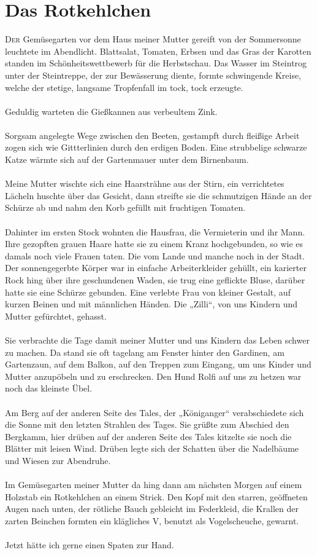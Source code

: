 \chapter{Das Rotkehlchen}
\lettrine{D}{er} Gemüsegarten vor dem Haus meiner Mutter gereift von der Sommersonne leuchtete im Abendlicht. Blattsalat, Tomaten, Erbsen und das Gras der Karotten standen im Schönheitswettbewerb für die Herbstschau. Das Wasser im Steintrog unter der Steintreppe, der zur Bewässerung diente, formte schwingende Kreise, welche der stetige, langsame Tropfenfall im tock, tock erzeugte.\\\\
Geduldig warteten die Gießkannen aus verbeultem Zink.\\\\
Sorgsam angelegte Wege zwischen den Beeten, gestampft durch fleißige Arbeit zogen sich wie Gittterlinien durch den erdigen Boden. Eine strubbelige schwarze Katze wärmte sich auf der Gartenmauer unter dem Birnenbaum. \\\\
Meine Mutter wischte sich eine Haarsträhne aus der Stirn, ein verrichtetes Lächeln huschte über das Gesicht, dann streifte sie die schmutzigen Hände an der Schürze ab und nahm den Korb gefüllt mit fruchtigen Tomaten. \\\\
Dahinter im ersten Stock wohnten die Hausfrau, die Vermieterin und ihr Mann. Ihre gezopften grauen Haare hatte sie zu einem Kranz hochgebunden, so wie es damals noch viele Frauen taten. Die vom Lande und manche noch in der Stadt. Der sonnengegerbte Körper war in einfache Arbeiterkleider gehüllt, ein karierter Rock hing über ihre geschundenen Waden, sie trug eine geflickte Bluse, darüber hatte sie eine Schürze gebunden. Eine verlebte Frau von kleiner Gestalt, auf kurzen Beinen und mit männlichen Händen. Die „Zilli“, von uns Kindern und Mutter gefürchtet, gehasst. \\\\
Sie verbrachte die Tage damit meiner Mutter und uns Kindern das Leben schwer zu machen. Da stand sie oft tagelang am Fenster hinter den Gardinen, am Gartenzaun, auf dem Balkon, auf den Treppen zum Eingang, um uns Kinder und Mutter anzupöbeln und zu erschrecken. Den Hund Rolfi auf uns zu hetzen war noch das kleinste Übel. \\\\
Am Berg auf der anderen Seite des Tales, der „Königanger“ verabschiedete sich die Sonne mit den letzten Strahlen des Tages. Sie grüßte zum Abschied den Bergkamm, hier drüben auf der anderen Seite des Tales kitzelte sie noch die Blätter mit leisen Wind. Drüben legte sich der Schatten über die Nadelbäume und Wiesen zur Abendruhe.\\\\
Im Gemüsegarten meiner Mutter da hing dann am nächsten Morgen auf einem Holzstab ein Rotkehlchen an einem Strick. Den Kopf mit den starren, geöffneten Augen nach unten, der rötliche Bauch gebleicht im Federkleid, die Krallen der zarten Beinchen formten ein klägliches V, benutzt als Vogelscheuche, gewarnt.\\\\
Jetzt hätte ich gerne einen Spaten zur Hand.
